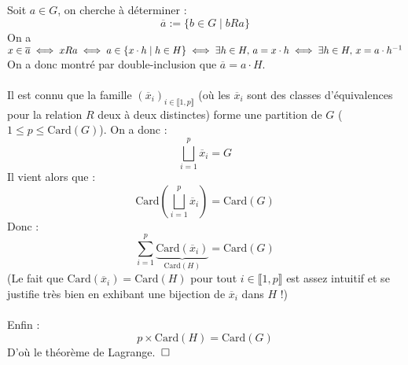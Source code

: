 \documentclass{article}
\begin{document}
Soit $a \in G$, on cherche à déterminer :
$$\overline{a} := \{b \in G \mid bRa\}$$
On a $x \in \overline{a} \iff xRa \iff a \in \{x \cdot h \mid h \in H\} \iff \exists h \in H, \thinspace a = x \cdot h \iff \exists h \in H, \thinspace x = a \cdot h^{-1}$
On a donc montré par double-inclusion que $\overline{a} = a \cdot H$.\\
\\
Il est connu que la famille $(\overline{x}_i)_{i \in \llbracket 1, p \rrbracket}$ 
(où les $\overline{x}_i$ sont des classes d'équivalences pour la relation $R$ deux à deux distinctes) forme une partition de $G$ ($1 \leq p \leq \text{Card}(G)$).
On a donc :
$$\bigsqcup_{i = 1}^p \overline{x}_i = G$$
Il vient alors que :
$$\text{Card}(\bigsqcup_{i = 1}^p \overline{x}_i) = \text{Card}(G)$$
Donc :
$$\sum_{i = 1}^p \underbrace{\text{Card}(\overline{x}_i)}_{\text{Card}(H)} = \text{Card}(G)$$
(Le fait que $\text{Card}(\overline{x}_i) = \text{Card}(H)$ pour tout $i \in \llbracket 1, p \rrbracket$ est assez intuitif et se justifie très bien en exhibant une bijection de $\overline{x}_i$ dans $H$ !)\\
\\
Enfin :
$$p \times \text{Card}(H) = \text{Card}(G)$$
D'où le théorème de Lagrange. $\thinspace \square$
\end{document}
